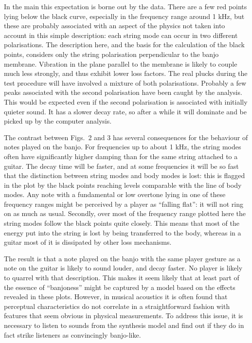   In the main this expectation is borne out by the data. There are a few red 
  points lying below the black curve, especially in the frequency range around 
  1 kHz, but these are probably associated with an aspect of the physics not 
  taken into account in this simple description: each string mode can occur in 
  two different polarisations. The description here, and the basis for the 
  calculation of the black points, considers only the string polarisation 
  perpendicular to the banjo membrane. Vibration in the plane parallel to the 
  membrane is likely to couple much less strongly, and thus exhibit lower loss 
  factors. The real plucks during the test procedure will have involved a 
  mixture of both polarisations. Probably a few peaks associated with the 
  second polarisation have been caught by the analysis. This would be expected 
  even if the second polarisation is associated with initially quieter sound. 
  It has a slower decay rate, so after a while it will dominate and be picked 
  up by the computer analysis. 

  The contrast between Figs.\ 2 and 3 has several consequences for the 
  behaviour of notes played on the banjo. For frequencies up to about 1 kHz, 
  the string modes often have significantly higher damping than for the same 
  string attached to a guitar. The decay time will be faster, and at some 
  frequencies it will be so fast that the distinction between string modes and 
  body modes is lost: this is flagged in the plot by the black points reaching 
  levels comparable with the line of body modes. Any note with a fundamental or 
  low overtone lying in one of these frequency ranges might be perceived by a 
  player as ``falling flat'': it will not ring on as much as usual. Secondly, 
  over most of the frequency range plotted here the string modes follow the 
  black points quite closely. This means that most of the energy put into the 
  string is lost by being transferred to the body, whereas in a guitar most of 
  it is dissipated by other loss mechanisms. 

  The result is that a note played on the banjo with the same player gesture as 
  a note on the guitar is likely to sound louder, and decay faster. No player 
  is likely to quarrel with that description. This makes it seem likely that at 
  least part of the essence of ``banjoness'' might be captured by a model based 
  on the effects revealed in these plots. However, in musical acoustics it is 
  often found that perceptual characteristics do not correlate in a 
  straightforward fashion with features that seem obvious in physical 
  measurements. To address this issue, it is necessary to listen to sounds from 
  the synthesis model and find out if they do in fact strike listeners as 
  convincingly banjo-like. 

